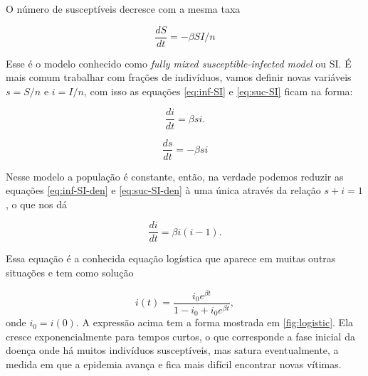 \documentclass[a4paper,11pt]{report}
\begin{document}
O n\'umero de suscept\'iveis decresce com a mesma taxa

\begin{equation}
\frac{dS}{dt}=-\beta SI/n
\label{eq:suc-SI}
\end{equation}

Esse \'e o modelo conhecido como \textit{fully mixed susceptible-infected model} ou SI. \'E mais comum trabalhar com fra\c{c}\~oes de indiv\'iduos, vamos definir novas vari\'aveis $s=S/n$ e $i=I/n$, com isso as equa\c{c}\~oes \ref{eq:inf-SI} e \ref{eq:suc-SI} ficam na forma:

\begin{equation}
\frac{di}{dt}=\beta si.
\label{eq:inf-SI-den}
\end{equation}

\begin{equation}
\frac{ds}{dt}=-\beta si
\label{eq:suc-SI-den}
\end{equation}

Nesse modelo a popula\c{c}\~ao \'e constante, ent\~ao, na verdade podemos reduzir as equa\c{c}\~oes \ref{eq:inf-SI-den} e \ref{eq:suc-SI-den} \`a uma \'unica atrav\'es da rela\c{c}\~ao $s+i=1$, o que nos d\'a

\begin{equation}
\frac{di}{dt}=\beta i(i-1).
\label{eq:log-eq}
\end{equation}

Essa equa\c{c}\~ao \'e a conhecida equa\c{c}\~ao log\'istica que aparece em muitas outras situa\c{c}\~oes e tem como solu\c{c}\~ao

\begin{equation}
i(t)=\frac{i_0 e^{\beta t}}{1-i_0+i_0 e^{\beta t}},
\label{eq:log-sol}
\end{equation}
onde $i_0=i(0)$. A express\~ao acima tem a forma mostrada em \ref{fig:logistic}. Ela cresce exponencialmente para tempos curtos, o que corresponde a fase inicial da doen\c{c}a onde h\'a muitos indiv\'iduos suscept\'iveis, mas satura eventualmente, a medida em que a epidemia avan\c{c}a e fica mais dif\'icil encontrar novas v\'itimas. 
\end{document}
